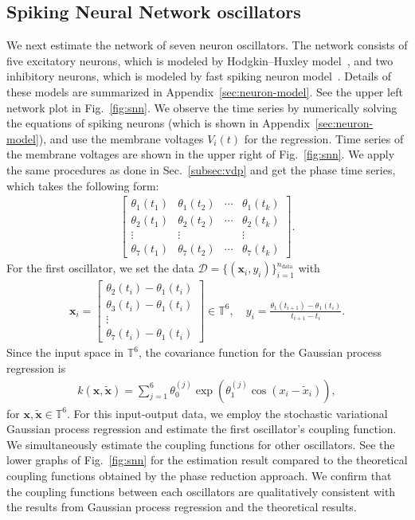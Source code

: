 \subsection{Spiking Neural Network oscillators}

We next estimate the network of seven neuron oscillators.
The network consists of five excitatory neurons, which is modeled by Hodgkin--Huxley model~\cite{hodgkin1952},
and two inhibitory neurons, which is modeled by fast spiking neuron model~\cite{erisir1999}.
Details of these models are summarized in Appendix~\ref{sec:neuron-model}.
See the upper left network plot in Fig.~\ref{fig:snn}.
We observe the time series by numerically solving the equations of spiking neurons (which is shown in Appendix~\ref{sec:neuron-model}), and use the membrane voltages $V_{i}(t)$ for the regression.
Time series of the membrane voltages are shown in the upper right of Fig.~\ref{fig:snn}.
We apply the same procedures as done in Sec.~\ref{subsec:vdp} and get the phase time series, which takes the following form:
\begin{align}
\begin{bmatrix}
    \theta_{1}(t_{1}) & \theta_{1}(t_{2}) & \cdots & \theta_{1}(t_{k})\\
    \theta_{2}(t_{1}) & \theta_{2}(t_{2}) & \cdots & \theta_{2}(t_{k})\\
    \vdots & \vdots &  & \vdots\\
    \theta_{7}(t_{1}) & \theta_{7}(t_{2}) & \cdots & \theta_{7}(t_{k})
\end{bmatrix}.
\end{align}
For the first oscillator, we set the data $\mathcal{D}=\{(\bm{x}_{i},y_{i})\}_{i=1}^{n_{\mathrm{data}}}$ with
\begin{align}
    \bm{x}_{i}=\begin{bmatrix}
        \theta_{2}(t_{i})-\theta_{1}(t_{i})\\
        \theta_{3}(t_{i})-\theta_{1}(t_{i})\\
        \vdots\\
        \theta_{7}(t_{i})-\theta_{1}(t_{i})
    \end{bmatrix}\in\mathbb{T}^{6},\quad
    y_{i}=\frac{\theta_{1}(t_{i+1})-\theta_{1}(t_{i})}{t_{i+1}-t_{i}}.
\end{align}
Since the input space in $\mathbb{T}^{6}$, the covariance function for the Gaussian process regression is
\begin{align}
    k(\bm{x},\tilde{\bm{x}})=\sum_{j=1}^{6}\theta_{0}^{(j)}\exp(\theta_{1}^{(j)}\cos(x_{i}-\tilde{x}_{i})),
\end{align}
for $\bm{x},\tilde{\bm{x}}\in\mathbb{T}^{6}$.
For this input-output data, we employ the stochastic variational Gaussian process regression and estimate the first oscillator's coupling function.
We simultaneously estimate the coupling functions for other oscillators.
See the lower graphs of Fig.~\ref{fig:snn} for the estimation result compared to the theoretical coupling functions obtained by the phase reduction approach.
We confirm that the coupling functions between each oscillators are qualitatively consistent with the results from Gaussian process regression and the theoretical results.

